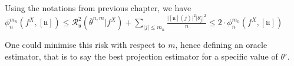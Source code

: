 Using the notations from previous chapter, we have $\phi_{n}^{m_{n}}(f^{X}, [\mathfrak{u}]) \leq \mathcal{R}_{\mathfrak{u}}^{2}(\overline{\theta}^{n, m} \vert f^{X}) + \sum\limits_{\vert j\vert \leq m_{n}}\frac{\vert[\mathfrak{u}](j)\vert^{2}\vert\theta^{\circ}_{j}\vert^{2}}{n} \leq 2 \cdot \phi_{n}^{m_{n}}(f^{X}, [\mathfrak{u}])$

One could minimise this risk with respect to $m$, hence defining an oracle estimator, that is to say the best projection estimator for a specific value of $\theta^{\circ}$.
